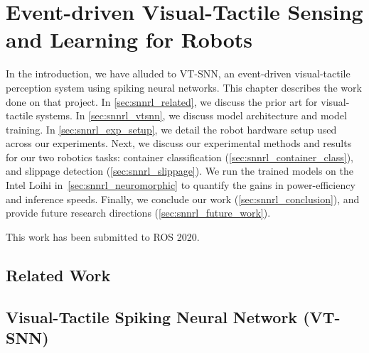 \documentclass[fyp]{socreport}
\begin{document}
\chapter{Event-driven Visual-Tactile Sensing and Learning for Robots\label{cha:vtsnn}}

In the introduction, we have alluded to VT-SNN, an event-driven
visual-tactile perception system using spiking neural networks. This chapter
describes the work done on that project. In \autoref{sec:snnrl_related}, we
discuss the prior art for visual-tactile systems. In \autoref{sec:snnrl_vtsnn},
we discuss model architecture and model training. In
\autoref{sec:snnrl_exp_setup}, we detail the robot hardware setup used across
our experiments. Next, we discuss our experimental methods and results for our
two robotics tasks: container classification
(\autoref{sec:snnrl_container_class}), and slippage detection
(\autoref{sec:snnrl_slippage}). We run the trained models on the Intel Loihi
in~\autoref{sec:snnrl_neuromorphic} to quantify the gains in power-efficiency
and inference speeds. Finally, we conclude our work
(\autoref{sec:snnrl_conclusion}), and provide future research directions
(\autoref{sec:snnrl_future_work}).

This work has been submitted to ROS 2020.

\section{Related Work\label{sec:snnrl_related}}

\section{Visual-Tactile Spiking Neural Network (VT-SNN)\label{sec:snnrl_vtsnn}}
\end{document}
